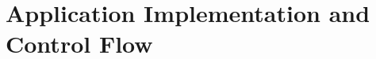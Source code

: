 \documentclass[conference,final]{IEEEtran}
\newcommand{\yaakoub}[0]{}
\newcommand{\jhanote}[1]{ {\textcolor{red} { ***Jha: #1 }}}
\begin{document}



\section{Application Implementation and Control Flow} 
\end{document}
